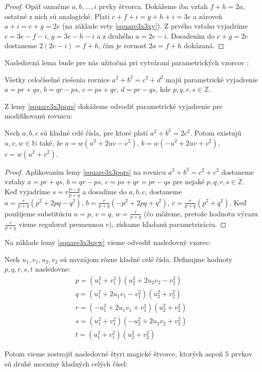 \begin{proof} Opäť označme $a, b, \dots , i$ prvky štvorca. Dokážeme iba vzťah $f + h = 2a$, ostatné z nich sú analogické. Platí $c + f + i = g + h + i = 3e$ a zároveň $a + i = c + g = 2e$ (na základe vety \ref{square3x3xy}). Z prvého vzťahu vyjadríme $c = 3e - f - i$, $g = 3e - h - i$ a z druhého $a = 2e - i$. Dosadením do $c + g = 2e$ dostaneme $2(2e - i) = f + h$, čím je rovnosť $2a = f + h$ dokázaná.
\end{proof}

Nasledovná lema bude pre nás užitočná pri vytváraní parametrických vzorcov \cite{algebraic}:

\begin{lemma}
\label{square3x3pqrs}
Všetky celočíselné riešenia rovnice $a^2 + b^2 = c^2 + d^2$ majú parametrické vyjadrenie $a = pr + qs$, $b = qr - ps$, $c = ps + qr$, $d = pr - qs$, kde $p,q,r,s \in \mathbb{Z}$.
\end{lemma}

Z lemy \ref{square3x3pqrs} dokážeme odvodiť parametrické vyjadrenie pre modifikovanú rovnicu:

\begin{lemma} 
\label{square3x3uvw}
Nech $a,b,c$ sú kladné celé čísla, pre ktoré platí $a^2 + b^2 = 2c^2$. Potom existujú $u,v,w \in \mathbb{N}$ také, že $a = w(u^2 + 2uv - v^2)$, $b = w(- u^2 + 2uv + v^2)$, $c = w(u^2 + v^2)$.
\end{lemma}

\begin{proof} 
Aplikovaním lemy \ref{square3x3pqrs} na rovnicu $a^2 + b^2 = c^2 + c^2$ dostaneme vzťahy $a = pr + qs$, $b = qr - ps$, $c = ps + qr = pr - qs$ pre nejaké $p,q,r,s \in \mathbb{Z}$. Keď vyjadríme $s = r \frac{p-q}{p+q}$ a dosadíme do $a,b,c$, dostaneme $a =  \frac{r}{p+q} (p^2 + 2pq - q^2)$, $b = \frac{r}{p+q} (-p^2 + 2pq + q^2)$, $c = \frac{r}{p+q} (p^2 + q^2)$. Keď použijeme substitúciu $u = p$, $v = q$, $w = \frac{r}{p+q}$ (čo môžeme, pretože hodnotu výrazu $\frac{r}{p+q}$ vieme regulovať premennou $r$), získame hľadanú parametrizáciu.
\end{proof}

Na základe lemy \ref{square3x3uvw} vieme odvodiť nasledovný vzorec:

\begin{theorem}
\label{3x3square5squares}
Nech $u_1, v_1, u_2, v_2$ sú navzájom rôzne kladné celé čísla. Definujme hodnoty $p,q,r,s,t$ nasledovne:
\begin{gather*}
p = (u_1^2 + v_1^2)(u_2^2 + 2u_2 v_2 - v_2^2) \\
q = (u_1^2 + 2u_1 v_1 - v_1^2)(u_2^2 + v_2^2) \\
r = (- u_1^2 + 2u_1 v_1 + v_1^2)(u_2^2 + v_2^2) \\
s = (u_1^2 + v_1^2)(-u_2^2 + 2u_2 v_2 + v_2^2) \\
t = (u_1^2 + v_1^2)(u_2^2 + v_2^2)
\end{gather*}

Potom vieme zostrojiť nasledovné štyri magické štvorce, ktorých aspoň $5$ prvkov sú druhé mocniny kladných celých čísel:
\end{theorem}

